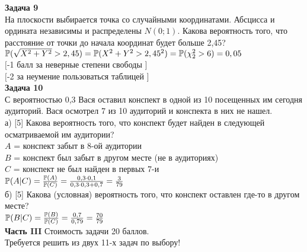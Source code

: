 \documentclass[pdftex,12pt,a4paper]{article}
\begin{document}
{\bf Задача 9} \\
На плоскости выбирается точка со случайными координатами. Абсцисса
и ордината независимы и распределены $N(0;1)$. Какова вероятность
того, что расстояние от точки до начала координат будет больше
2,45? \\
$\P(\sqrt{X^{2}+Y^{2}}>2,45)=\P(X^{2}+Y^{2}>2,45^{2})=\P(\chi_{2}^{2}>6)=0,05$
\\
$[$-1 балл за неверные степени свободы $]$ \\
$[$-2 за неумение пользоваться таблицей $]$ \\


{\bf Задача 10} \\
С вероятностью 0,3 Вася оставил конспект в одной из 10 посещенных
им сегодня аудиторий. Вася осмотрел 7 из 10 аудиторий и конспекта
в них не нашел. \\
а) [5] Какова вероятность того, что конспект будет найден в
следующей
осматриваемой им аудитории? \\
$A$ = конспект забыт в 8-ой аудитории \\
$B$ = конспект был забыт в другом месте (не в аудиториях) \\
$C$ = конспект не был найден в первых 7-и \\
$\P(A|C)=\frac{\P(A)}{\P(C)}=\frac{0,3\cdot 0,1}{0,3\cdot
0,3+0,7}=\frac{3}{79}$ \\
б) [5] Какова (условная) вероятность того, что конспект оставлен
где-то в другом месте? \\
$\P(B|C)=\frac{\P(B)}{\P(C)}=\frac{0,7}{0,79}=\frac{70}{79}$ \\

{\bf Часть III} Стоимость задачи 20 баллов. \\

Требуется решить {\bf {}} из двух 11-х задач по
выбору! \\
\end{document}
